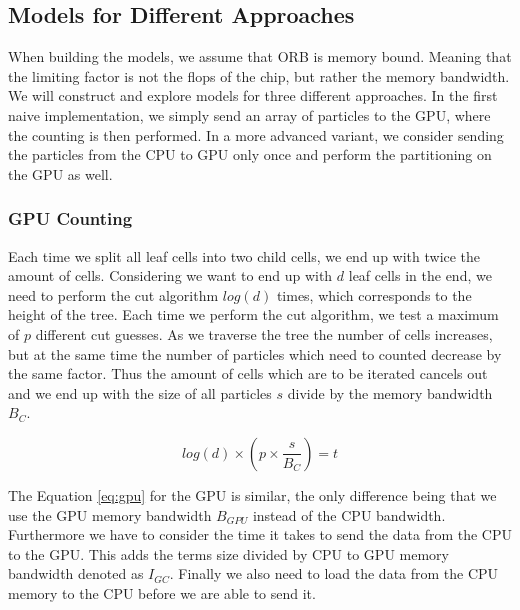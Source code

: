 \documentclass[]{article}
\begin{document}
\subsection{Models for Different Approaches}

When building the models, we assume that ORB is memory bound. Meaning that the limiting factor is not the flops of the chip, but rather the memory bandwidth. We will construct and explore models for three different approaches. In the first naive implementation, we simply send an array of particles to the GPU, where the counting is then performed. In a more advanced variant, we consider sending the particles from the CPU to GPU only once and perform the partitioning on the GPU as well.  
 
\subsubsection{GPU Counting}

Each time we split all leaf cells into two child cells, we end up with twice the amount of cells. Considering we want to end up with $d$ leaf cells in the end, we need to perform the cut algorithm $log(d)$ times, which corresponds to the height of the tree. Each time we perform the cut algorithm, we test a maximum of $p$ different cut guesses. As we traverse the tree the number of cells increases, but at the same time the number of particles which need to counted decrease by the same factor. Thus the amount of cells which are to be iterated cancels out and we end up with the size of all particles $s$ divide by the memory bandwidth $B_C$.  
 
\begin{center}
	\begin{equation}
			log(d) \times \left ( p \times \frac{ s }{B_{C}} \right ) = t
			\label{eq:cpu}
	\end{equation}
\end{center}

\vspace{5mm}


The Equation \ref{eq:gpu} for the GPU is similar, the only difference being that we use the GPU memory bandwidth $B_{GPU}$ instead of the CPU bandwidth. Furthermore we have to consider the time it takes to send the data from the CPU to the GPU. This adds the terms size divided by CPU to GPU memory bandwidth denoted as $I_{GC}$. Finally we also need to load the data from the CPU memory to the CPU before we are able to send it. 
\end{document}
